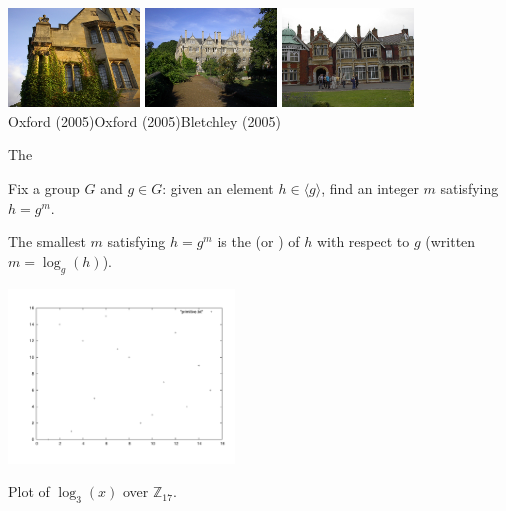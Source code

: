 \begin{frame}
\begin{center}
\includegraphics[width=3.5cm]{Figures/Oxford-1.jpg}
\hfill
\includegraphics[width=3.5cm]{Figures/Oxford-2.jpg}
\hfill
\includegraphics[width=3.5cm]{Figures/Bletchley.jpg} \\
Oxford (2005)\hfill Oxford (2005)\hfill Bletchley (2005)
\end{center}
\end{frame}

\begin{frame}
The 

Fix a group $G$ and $g\in G$: given an element $h\in\langle g\rangle$,
find an integer $m$ satisfying $h=g^m$.

The smallest $m$ satisfying $h=g^m$ is the  (or
) of $h$ with respect to $g$ (written $m=\log_g(h)$).
\begin{center}
\includegraphics[width=6cm]{Figures/log.pdf}

Plot of $\log_3(x)$ over $\mathbb{Z}_{17}$.
\end{center}
\end{frame}

